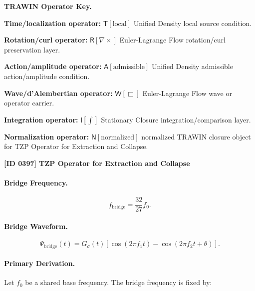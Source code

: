 \par\vspace{0.45\baselineskip}
\noindent\begin{minipage}[t]{\linewidth}
\begingroup
\small
\raggedright
\textbf{TRAWIN Operator Key.}\par
\noindent\textbf{Time/localization operator:} $\mathsf{T}\!\left[\mathrm{local}\right]$ Unified Density local source condition.\par
\noindent\textbf{Rotation/curl operator:} $\mathsf{R}\!\left[\nabla\times\right]$ Euler-Lagrange Flow rotation/curl preservation layer.\par
\noindent\textbf{Action/amplitude operator:} $\mathsf{A}\!\left[\mathrm{admissible}\right]$ Unified Density admissible action/amplitude condition.\par
\noindent\textbf{Wave/d'Alembertian operator:} $\mathsf{W}\!\left[\Box\right]$ Euler-Lagrange Flow wave or operator carrier.\par
\noindent\textbf{Integration operator:} $\mathsf{I}\!\left[\int\right]$ Stationary Closure integration/comparison layer.\par
\noindent\textbf{Normalization operator:} $\mathsf{N}\!\left[\mathrm{normalized}\right]$ normalized TRAWIN closure object for TZP Operator for Extraction and Collapse.\par
\endgroup
\end{minipage}

\clearpage
\noindent\textbf{[ID 0397] TZP Operator for Extraction and Collapse}\par
\vspace{0.35em}
\paragraph{Bridge Frequency.}
\begin{equation}
f_{\mathrm{bridge}}=\frac{32}{27}f_0.
\end{equation}

\paragraph{Bridge Waveform.}
\begin{equation}
\Psi_{\mathrm{bridge}}(t)
=
G_{\sigma}(t)
\left[
\cos(2\pi f_1t)
-
\cos(2\pi f_2t+\theta)
\right].
\end{equation}

\paragraph{Primary Derivation.}
Let $f_0$ be a shared base frequency.  
The bridge frequency is fixed by:

